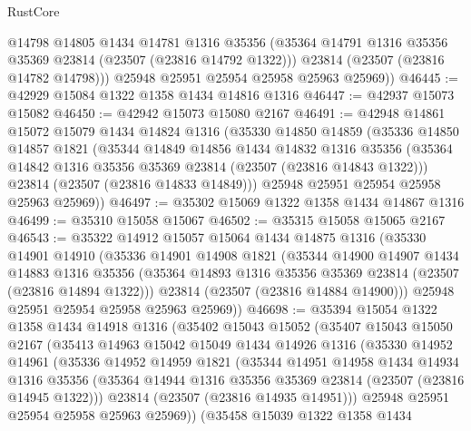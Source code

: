 \begin{lexlean}{RustCore}
\begin{coremodule}
          @14798
          @14805
          @1434
          @14781
          @1316
          @35356
          (@35364 @14791 @1316 @35356 @35369 @23814 (@23507 (@23816 @14792 @1322)))
          @23814
          (@23507 (@23816 @14782 @14798)))
        @25948
        @25951
        @25954
        @25958
        @25963
        @25969))
@46445 := @42929 @15084 @1322 @1358 @1434 @14816 @1316
@46447 := @42937 @15073 @15082
@46450 := @42942 @15073 @15080 @2167
@46491 := @42948
    @14861
    @15072
    @15079
    @1434
    @14824
    @1316
    (@35330
      @14850
      @14859
      (@35336
        @14850
        @14857
        @1821
        (@35344
          @14849
          @14856
          @1434
          @14832
          @1316
          @35356
          (@35364 @14842 @1316 @35356 @35369 @23814 (@23507 (@23816 @14843 @1322)))
          @23814
          (@23507 (@23816 @14833 @14849)))
        @25948
        @25951
        @25954
        @25958
        @25963
        @25969))
@46497 := @35302 @15069 @1322 @1358 @1434 @14867 @1316
@46499 := @35310 @15058 @15067
@46502 := @35315 @15058 @15065 @2167
@46543 := @35322
    @14912
    @15057
    @15064
    @1434
    @14875
    @1316
    (@35330
      @14901
      @14910
      (@35336
        @14901
        @14908
        @1821
        (@35344
          @14900
          @14907
          @1434
          @14883
          @1316
          @35356
          (@35364 @14893 @1316 @35356 @35369 @23814 (@23507 (@23816 @14894 @1322)))
          @23814
          (@23507 (@23816 @14884 @14900)))
        @25948
        @25951
        @25954
        @25958
        @25963
        @25969))
@46698 := @35394
    @15054
    @1322
    @1358
    @1434
    @14918
    @1316
    (@35402
      @15043
      @15052
      (@35407
        @15043
        @15050
        @2167
        (@35413
          @14963
          @15042
          @15049
          @1434
          @14926
          @1316
          (@35330
            @14952
            @14961
            (@35336
              @14952
              @14959
              @1821
              (@35344
                @14951
                @14958
                @1434
                @14934
                @1316
                @35356
                (@35364 @14944 @1316 @35356 @35369 @23814 (@23507 (@23816 @14945 @1322)))
                @23814
                (@23507 (@23816 @14935 @14951)))
              @25948
              @25951
              @25954
              @25958
              @25963
              @25969))
          (@35458
            @15039
            @1322
            @1358
            @1434

\end{coremodule}
\end{lexlean}

